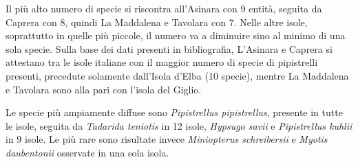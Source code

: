 {Il più alto numero di specie si riscontra all’Asinara con 9 entità, seguita da Caprera con 8, quindi La Maddalena e Tavolara con 7. Nelle altre isole, soprattutto in quelle più piccole, il numero va a diminuire sino al minimo di una sola specie. Sulla base dei dati presenti in bibliografia, L’Asinara e Caprera si attestano tra le isole italiane con il maggior numero di specie di pipistrelli presenti, precedute solamente dall’Isola d’Elba (10 specie), mentre La Maddalena e Tavolara sono alla pari con l’isola del Giglio.

Le specie più ampiamente diffuse sono \emph{Pipistrellus pipistrellus}, presente in tutte le isole, seguita da \emph{Tadarida teniotis} in 12 isole, \emph{Hypsugo savii} e \emph{Pipistrellus kuhlii} in 9 isole. Le più rare sono risultate invece \emph{Miniopterus schreibersii} e \emph{Myotis  daubentonii} osservate in una sola isola.
} %